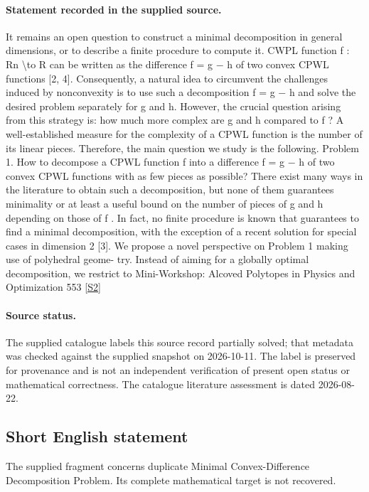 \documentclass[11pt]{article}
\newcommand{\sref}[2]{\hyperlink{source:#1:#2}{[S#2]}}
\begin{document}
\paragraph{Statement recorded in the supplied source.}
It remains an open question to construct a minimal decomposition in general dimensions, or to describe a finite procedure to compute it. CWPL function f : Rn \textbackslash{}to R can be written as the difference f = g − h of two convex CPWL functions [2, 4]. Consequently, a natural idea to circumvent the challenges induced by nonconvexity is to use such a decomposition f = g − h and solve the desired problem separately for g and h. However, the crucial question arising from this strategy is: how much more complex are g and h compared to f ? A well-established measure for the complexity of a CPWL function is the number of its linear pieces. Therefore, the main question we study is the following. Problem 1. How to decompose a CPWL function f into a difference f = g − h of two convex CPWL functions with as few pieces as possible? There exist many ways in the literature to obtain such a decomposition, but none of them guarantees minimality or at least a useful bound on the number of pieces of g and h depending on those of f . In fact, no finite procedure is known that guarantees to find a minimal decomposition, with the exception of a recent solution for special cases in dimension 2 [3]. We propose a novel perspective on Problem 1 making use of polyhedral geome- try. Instead of aiming for a globally optimal decomposition, we restrict to Mini-Workshop: Alcoved Polytopes in Physics and Optimization 553 \sref{30006218}{2}
\paragraph{Source status.}
The supplied catalogue labels this source record partially solved; that metadata was checked against the supplied snapshot on 2026-10-11. The label is preserved for provenance and is not an independent verification of present open status or mathematical correctness. The catalogue literature assessment is dated 2026-08-22.
\subsection{Short English statement}
The supplied fragment concerns duplicate Minimal Convex-Difference Decomposition Problem. Its complete mathematical target is not recovered.
\end{document}
